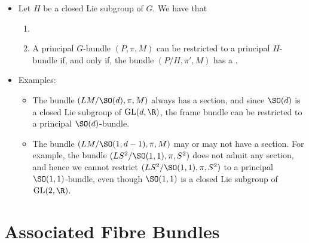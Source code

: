 \documentclass{article}
\newcommand{\GL}{\operatorname{GL}}
\begin{document}
\begin{enumerate}
\begin{itemize}
    \item Let $H$ be a closed Lie subgroup of $G$. We have that
\begin{enumerate}
\item {}
\item A principal $G$-bundle $(P,\pi,M)$ can be restricted to a principal $H$-bundle if, and only if, the bundle $(P/H,\pi',M)$ has a .
\end{enumerate}
\item Examples:
\begin{itemize}[$\dagger$]
   \item The bundle $(LM/\SO(d),\pi,M)$ always has a section, and since $\SO(d)$ is a closed Lie subgroup of $\GL(d,\R)$, the frame bundle can be restricted to a principal $\SO(d)$-bundle.    
\item The bundle $(LM/\SO(1,d-1),\pi,M)$ may or may not have a section.  For example, the bundle $(LS^2/\SO(1,1),\pi,S^2)$ does not admit any section, and hence we cannot restrict $(LS^2/\SO(1,1),\pi,S^2)$ to a principal $\SO(1,1)$-bundle, even though $\SO(1,1)$ is a closed Lie subgroup of $\GL(2,\R)$. 
\end{itemize}
\end{itemize}
\end{enumerate}


\section{Associated Fibre Bundles}\label{sece:asso}
\end{document}
